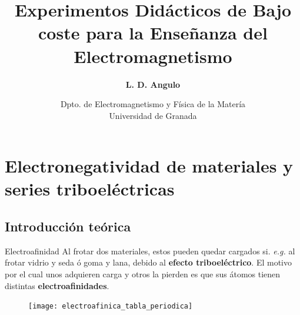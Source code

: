 \documentclass[]{presentation}
\title{Experimentos Didácticos de Bajo coste para la Enseñanza del Electromagnetismo}
\author[L. D. Angulo]{\small
 	\textbf{L. D. Angulo} 
}
\institute[UGR]{
	\begin{minipage}{3cm}
		\centering
		\href{http://www.ugr.es}{\texttt{[image: escudougr.pdf]}}
	\end{minipage}
}
\date[2018-06-26]{Dpto. de Electromagnetismo y Física de la Matería\\
                  Universidad de Granada}
\begin{document}
\begin{frame}[plain]
 \titlepage
\end{frame}

\begin{frame}
	\tableofcontents[hideallsubsections]
\end{frame} 

\section{Electronegatividad de materiales y series triboeléctricas}
\subsection{Introducción teórica}
\begin{frame}{Electroafinidad}
Al frotar dos materiales, estos pueden quedar cargados si. \textit{e.g.} al frotar vidrio y seda ó goma y lana, debido al \textbf{efecto triboeléctrico}. El motivo por el cual unos adquieren carga y otros la pierden es que sus átomos tienen distintas \textbf{electroafinidades}.
\begin{figure}
	\centering
	\texttt{[image: electroafinica\_tabla\_periodica]}
\end{figure}
\end{frame}
\end{document}
